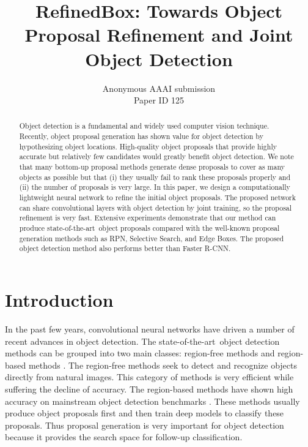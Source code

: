 \documentclass[letterpaper]{article} %
\def\sArt{{state-of-the-art~}}
\begin{document}
%
\title{RefinedBox: Towards Object Proposal Refinement and Joint Object Detection}
\author{Anonymous AAAI submission\\
Paper ID 125\\
}
\maketitle


\begin{abstract}
Object detection is a fundamental and widely used computer vision technique.
Recently, object proposal generation has shown value for object
detection by hypothesizing object locations.
High-quality object proposals that provide highly accurate but relatively
few candidates would greatly benefit object detection.
We note that many bottom-up proposal methods generate dense proposals
to cover as many objects as possible but that (i) they usually fail to rank these
proposals properly and (ii) the number of proposals is very large.
In this paper, we design a computationally lightweight neural network to refine
the initial object proposals.
The proposed network can share convolutional layers with object detection by
joint training, so the proposal refinement is very fast.
Extensive experiments demonstrate that our method can produce \sArt object
proposals compared with the well-known proposal generation methods such
as RPN, Selective Search, and Edge Boxes.
The proposed object detection method also performs better than Faster R-CNN.
\end{abstract}


\section {Introduction}
%
In the past few years, convolutional neural networks have driven a number of
recent advances in object detection.
%
The \sArt object detection methods can be grouped into two main classes:
region-free methods \cite{redmon2016you,liu2016ssd}
and region-based methods \cite{girshick2014rich,girshick2015fast,ren2015faster}.
%
The region-free methods seek to detect and recognize objects directly from natural images.
This category of methods is very efficient while suffering the decline of accuracy.
%
The region-based methods have shown high accuracy on mainstream object detection
benchmarks \cite{lin2014microsoft,pascal-voc-2007}.
These methods usually produce object proposals first and then
train deep models to classify these proposals.
Thus proposal generation is very important for object detection because it provides
the search space for follow-up classification.
\end{document}
